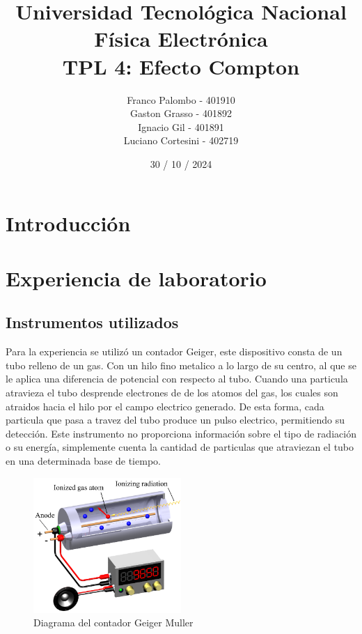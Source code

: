 \documentclass[a4paper,12pt]{report}
\title{%
  \fontsize{25}{0}\selectfont Universidad Tecnológica Nacional \\
  \fontsize{22}{30}\selectfont Física Electrónica \\
  \fontsize{18}{25}\selectfont TPL 4: Efecto Compton
}
\author{
Franco Palombo - 401910\\
Gaston Grasso - 401892\\
Ignacio Gil - 401891\\
Luciano Cortesini - 402719\\
}
\date{30 / 10 / 2024}
\begin{document}
\maketitle

\chapter{Introducción}

\chapter{Experiencia de laboratorio}
  \section{Instrumentos utilizados}
    Para la experiencia se utilizó un contador Geiger, este dispositivo consta de un tubo relleno de un gas. Con un hilo fino metalico a lo largo de su centro,
    al que se le aplica una diferencia de potencial con respecto al tubo. Cuando una particula atravieza el tubo desprende electrones de
    de los atomos del gas, los cuales son atraidos hacia el hilo por el campo electrico generado. De esta forma, cada particula que pasa a travez del tubo produce
    un pulso electrico, permitiendo su detección. Este instrumento no proporciona información sobre el tipo de radiación o su energía, simplemente cuenta la cantidad
    de particulas que atraviezan el tubo en una determinada base de tiempo.

    \begin{figure}[h]
        \centering
        \includegraphics[width=0.5\textwidth]{images/gmCounter.png}
        \caption{Diagrama del contador Geiger Muller}
        \label{fig:etiqueta}
    \end{figure}

  \newpage
\end{document}
